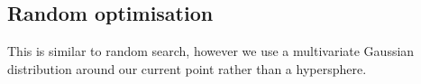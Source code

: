 
\subsection{Random optimisation}

This is similar to random search, however we use a multivariate Gaussian distribution around our current point rather than a hypersphere.

